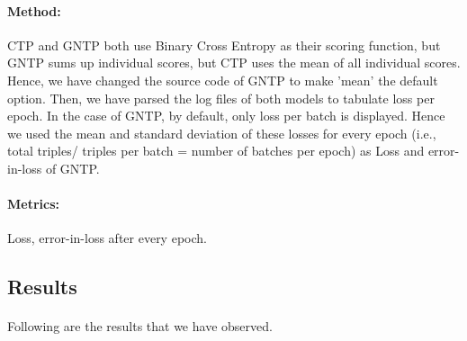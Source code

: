 \documentclass[Other]{iitddiss}
\begin{document}
\paragraph{Method: }
CTP and GNTP both use Binary Cross Entropy as their scoring function, but GNTP sums up individual scores, but CTP uses the mean of all individual scores. Hence, we have changed the source code of GNTP to make 'mean' the default option. Then, we have parsed the log files of both models to tabulate loss per epoch. In the case of GNTP, by default, only loss per batch is displayed. Hence we used the mean and standard deviation of these losses for every epoch (i.e., total triples/ triples per batch = number of batches per epoch) as Loss and error-in-loss of GNTP.

\paragraph{Metrics:}
Loss, error-in-loss after every epoch.

\subsection{Results}
\paragraph{}
Following are the results that we have observed.
\end{document}
